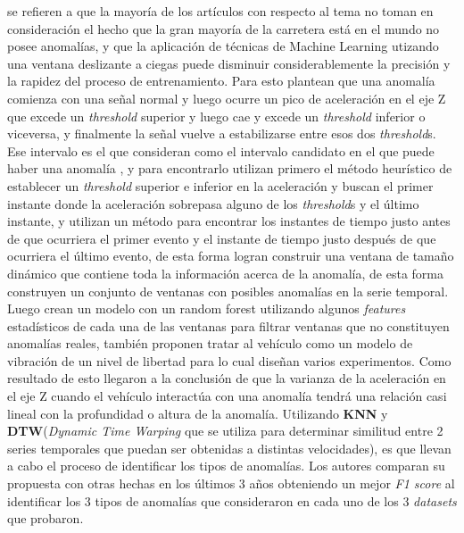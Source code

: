 \cite{zheng2020fused} se refieren a que la mayoría de los artículos con respecto al tema no toman en consideración el hecho que la gran mayoría de la
carretera está en el mundo no posee anomalías, y que la aplicación de técnicas de Machine Learning utizando una ventana deslizante a ciegas puede
disminuir considerablemente la precisión y la rapidez del proceso de entrenamiento. Para esto plantean que una anomalía comienza con una señal normal
y luego ocurre un pico de aceleración en el eje Z que excede un \emph{threshold} superior y luego cae y excede un \emph{threshold} inferior o viceversa,
y finalmente la señal vuelve a estabilizarse entre esos dos \emph{threshold}s. Ese intervalo es el que consideran como el intervalo candidato en el que
puede haber una anomalía , y para encontrarlo utilizan primero el método heurístico de establecer un \emph{threshold} superior e inferior en la aceleración
y buscan el primer instante donde la aceleración sobrepasa alguno de los \emph{threshold}s y el último instante, y utilizan un método para encontrar los
instantes de tiempo justo antes de que ocurriera el primer evento y el instante de tiempo justo después de que ocurriera el último evento, de esta forma
logran construir una ventana de tamaño dinámico que contiene toda la información acerca de la anomalía, de esta forma construyen un conjunto de ventanas
con posibles anomalías en la serie temporal. Luego crean un modelo con un random forest utilizando algunos \emph{features} estadísticos de cada una de las ventanas
para filtrar ventanas que no constituyen anomalías reales, también proponen tratar al vehículo como un modelo de vibración de un nivel de libertad para lo
cual diseñan varios experimentos. Como resultado de esto llegaron a la conclusión de que la varianza de la aceleración en el eje Z cuando el vehículo interactúa
con una anomalía tendrá una relación casi lineal con la profundidad o altura de la anomalía. Utilizando \textbf{KNN} y \textbf{DTW}(\emph{Dynamic Time Warping}
que se utiliza para determinar similitud entre 2 series temporales que puedan ser obtenidas a distintas velocidades), es que llevan a cabo el proceso
de identificar los tipos de anomalías. Los autores comparan su propuesta con otras hechas en los últimos 3 años obteniendo un mejor \emph{F1 score} al
identificar los 3 tipos de anomalías que consideraron en cada uno de los 3 \emph{datasets} que probaron.
